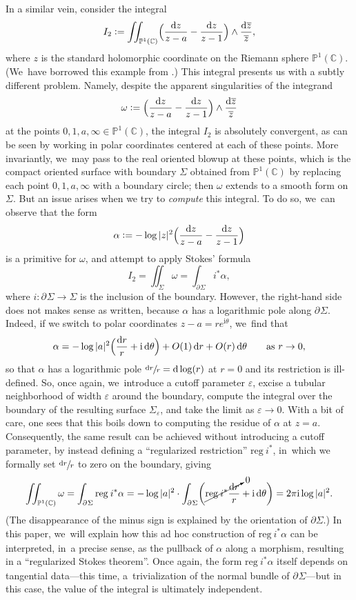 \documentclass[JEP,XML,SOM,Unicode,NoFloatCountersInSection,published]{cedram}
\newcommand{\rBrac}[1]{\Bigl(#1\Bigr)}
\newcommand{\rbbrac}[1]{\biggl(#1\biggr)}
\newcommand{\dslog}[1]{\sfrac{\dd#1}{#1}}
\theoremstyle{definition}
\theoremstyle{remark}
\newcommand{\CC}{\mathbb{C}}
\newcommand{\PP}{\mathbb{P}}
\newcommand{\iu}{\mathrm{i}}
\newcommand{\defas}{\mathrel{\mathop:}=}
\newcommand{\zb}{\overline{z}}
\let\epsilon\varepsilon
\newcommand{\dd}{\mathrm{d}}
\newcommand{\dlog}[1]{\frac{\dd#1}{#1}}
\newcommand{\reg}[1][]{\mathrm{reg}_{#1}}
\newcommand{\Sig}{\Sigma}
\newcommand{\bdSig}[1][]{\partial^{#1}\Sigma}
\begin{document}
In a similar vein, consider the integral
\[
I_2 \defas \iint_{\PP^1(\CC)} \rBrac{\frac{\dd z}{z-a} - \frac{\dd z}{z-1}} \wedge \dlog{\zb},
\]
where $z$ is the standard holomorphic coordinate on the Riemann sphere $\PP^1(\CC)$. (We~have borrowed this example from \cite{BrownDupont}.) This integral presents us with a subtly different problem. Namely, despite the apparent singularities of the integrand
\[
\omega \defas \rBrac{\frac{\dd z}{z-a} - \frac{\dd z}{z-1}} \wedge \dlog{\zb}
\]
at the points $0,1,a,\infty \in \PP^1(\CC)$, the integral
$I_2$ is absolutely convergent, as can be seen by working in polar coordinates centered at each of these points. More invariantly, we~may pass to the real oriented blowup at these points, which is the compact oriented surface with boundary $\Sig$ obtained from $\PP^1(\CC)$ by replacing each point $0,1,a,\infty$ with a boundary circle; then $\omega$ extends to a smooth form on $\Sig$. But an issue arises when we try to \emph{compute} this integral. To do so, we~can observe that the form\vspace*{-3pt}
\[
\alpha \defas -\log|z|^2 \rBrac{\frac{\dd z}{z-a} - \frac{\dd z}{z-1}}
\]
is a primitive for $\omega$, and attempt to apply Stokes' formula\vspace*{-3pt}
\[
I_2=\iint_\Sig\omega = \int_{\bdSig}i^*\alpha,
\]
where $i\colon \bdSig \to \Sig$ is the inclusion of the boundary. However, the right-hand side does not makes sense as written, because $\alpha$ has a logarithmic pole along $\bdSig$. Indeed, if we switch to polar coordinates $z - a = r e^{\iu\theta}$, we~find that\vspace*{-3pt}
\[
\alpha = -\log|a|^2 \rBrac{\dlog{r} + \iu\, \dd \theta} + O(1)\,\dd r + O(r)\,\dd \theta \qquad \textrm{as }r\to 0,
\]
so that $\alpha$ has a logarithmic pole $\dslog{r} = \dd\log(r)$ at $r=0$ and its restriction is ill-defined. So, once again, we~introduce a cutoff parameter $\epsilon$, excise a tubular neighborhood of width $\epsilon$ around the boundary, compute the integral over the boundary of the resulting surface $\Sig_\epsilon$, and take the limit as $\epsilon \to 0$. With a bit of care, one sees that this boils down to computing the residue of $\alpha$ at $z=a$. Consequently, the same result can be achieved without introducing a cutoff parameter, by instead defining a ``regularized restriction'' $\reg\, i^*$, in~which we formally set $\dslog{r}$ to zero on the boundary, giving\vspace*{-3pt}
\[
\iint_{\PP^1(\CC)} \omega = \int_{\bdSig} \reg\, i^*\alpha = -\log|a|^2 \cdot \int_{\bdSig} \rbbrac{\cancelto{0}{\reg\, i^* \dlog{r}} + \iu\, \dd\theta} = 2\pi\iu \log|a|^2.
\]
(The disappearance of the minus sign is explained by the orientation of $\partial\Sig$.) In this paper, we~will explain how this ad hoc construction of $\reg\, i^*\alpha$ can be interpreted, in~a precise sense, as the pullback of $\alpha$ along a morphism, resulting in a ``regularized Stokes theorem''. Once again, the form $\reg\, i^* \alpha$ itself depends on tangential data---this time, a~trivialization of the normal bundle of $\bdSig$---but in this case, the value of the integral is ultimately independent.
\end{document}
